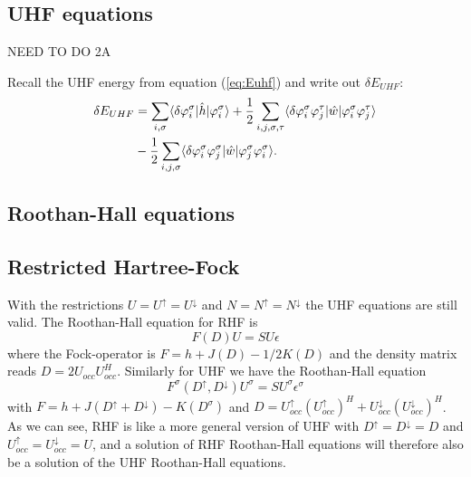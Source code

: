 \documentclass[norsk,a4paper,12pt]{article}
\begin{document}
\subsection{UHF equations}
NEED TO DO 2A

Recall the UHF energy from equation (\ref{eq:Euhf}) and write out $\delta E_{UHF}$:
\begin{align}
\delta E_{UHF} &=\sum_{i,\sigma}\langle\delta\varphi_i^{\sigma}|\hat{h}|\varphi_i^{\sigma}\rangle+\frac{1}{2}\sum_{i,j,\sigma,\tau}\langle\delta\varphi_i^{\sigma}\varphi_j^{\tau}|\hat{w}|\varphi_i^{\sigma}\varphi_j^{\tau}\rangle\\
&-\frac{1}{2}\sum_{i,j,\sigma}\langle\delta\varphi_i^{\sigma}\varphi_j^{\sigma}|\hat{w}|\varphi_j^{\sigma}\varphi_i^{\sigma}\rangle\notag.
\end{align}

\subsection{Roothan-Hall equations}
\subsection{Restricted Hartree-Fock}
With the restrictions $U=U^{\uparrow}=U^{\downarrow}$ and $N=N^{\uparrow}=N^{\downarrow}$ the UHF equations are still valid. The Roothan-Hall equation for RHF is
\begin{equation}
F(D)U=SU\epsilon
\end{equation}
where the Fock-operator is $F=h+J(D)-1/2K(D)$ and the density matrix reads $D=2U_{occ}U_{occ}^H$.
Similarly for UHF we have the Roothan-Hall equation
\begin{equation}
F^{\sigma}(D^{\uparrow},D^{\downarrow})U^{\sigma}=SU^{\sigma}\epsilon^{\sigma}
\end{equation}
with $F=h+J(D^{\uparrow}+D^{\downarrow})-K(D^{\sigma})$ and $D=U_{occ}^{\uparrow}(U_{occ}^{\uparrow})^H+U_{occ}^{\downarrow}(U_{occ}^{\downarrow})^H$. As we can see, RHF is like a more general version of UHF with $D^{\uparrow}=D^{\downarrow}=D$ and $U_{occ}^{\uparrow}=U_{occ}^{\downarrow}=U$, and a solution of RHF Roothan-Hall equations will therefore also be a solution of the UHF Roothan-Hall equations. 
\end{document}

